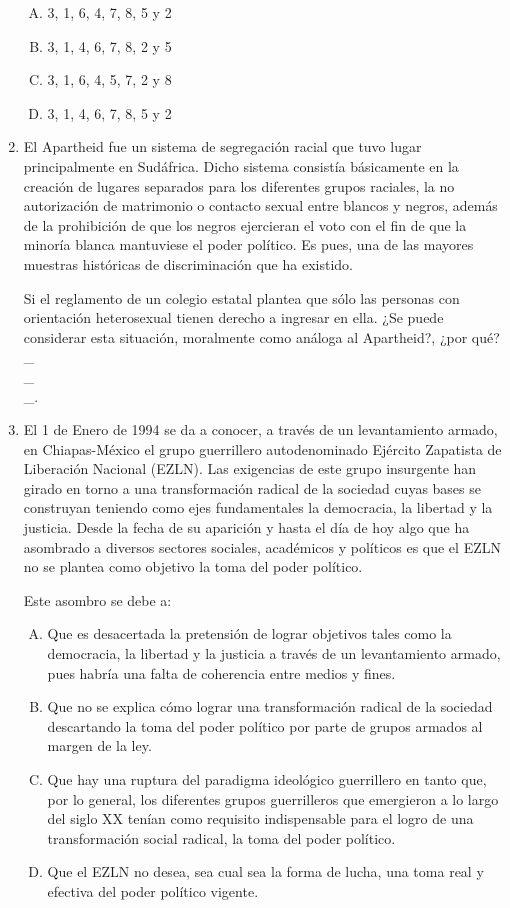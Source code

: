 \begin{enumerate}
\begin{enumerate}[(A)]
\item 3, 1, 6, 4, 7, 8, 5 y 2
\item 3, 1, 4, 6, 7, 8, 2 y 5
\item 3, 1, 6, 4, 5, 7, 2 y 8
\item 3, 1, 4, 6, 7, 8, 5 y 2  
\end{enumerate}
\item El Apartheid fue un sistema de segregación racial que tuvo lugar principalmente en Sudáfrica. Dicho sistema consistía básicamente en la creación de lugares separados para los diferentes grupos raciales, la no autorización de matrimonio o contacto sexual entre blancos y negros, además de la prohibición de que los negros ejercieran el voto con el fin de que la minoría blanca mantuviese el poder político. Es pues, una de las mayores muestras históricas de discriminación que ha existido. \label{socandres-15}

Si el reglamento de un colegio estatal plantea que sólo las personas con orientación heterosexual tienen derecho a ingresar en ella. ¿Se puede considerar esta situación, moralmente como análoga al Apartheid?, ¿por qué?
\hrulefill\\
\_\hrulefill\\
\_\hrulefill\\
\_\hrulefill.

\item El 1 de Enero de 1994 se da a conocer, a través de un levantamiento armado, en Chiapas-México el grupo guerrillero autodenominado Ejército Zapatista de Liberación Nacional (EZLN). Las exigencias de este grupo insurgente han girado en torno a una transformación radical de la sociedad cuyas bases se construyan teniendo como ejes fundamentales la democracia, la libertad y la justicia. Desde la fecha de su aparición y hasta el día de hoy algo que ha asombrado a diversos sectores sociales, académicos y políticos es que el EZLN no se plantea como objetivo la toma del poder político. \label{socandres-16}

Este asombro se debe a:

\begin{enumerate}[(A)]
\item Que es desacertada la pretensión de lograr objetivos tales como la democracia, la libertad y la justicia a través de un levantamiento armado, pues habría una falta de coherencia entre medios y fines.
\item Que no se explica cómo lograr una transformación radical de la sociedad descartando la toma del poder político por parte de grupos armados al margen de la ley.
\item Que hay una ruptura del paradigma ideológico guerrillero en tanto que, por lo general, los diferentes grupos guerrilleros que emergieron a lo largo del siglo XX tenían como requisito indispensable para el logro de una transformación social radical, la toma del poder político.
\item Que el EZLN no desea, sea cual sea la forma de lucha, una toma real y efectiva del poder político vigente.
\end{enumerate}


\end{enumerate}
